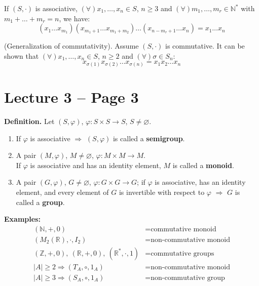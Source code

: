 \begin{corollary}
If $(S, \cdot)$ is associative, $(\forall) x_1, \dots, x_n \in S$, $n \ge 3$ and $(\forall) m_1, \dots, m_r \in \mathbb{N}^*$ with $m_1 + \dots + m_r = n$, we have:
$$ (x_1 \dots x_{m_1})(x_{m_1+1} \dots x_{m_1+m_2}) \dots (x_{n-m_r+1} \dots x_n) = x_1 \dots x_n $$
\end{corollary}

\begin{example}
(Generalization of commutativity). Assume $(S, \cdot)$ is commutative. It can be shown that $(\forall) x_1, \dots, x_n \in S$, $n \ge 2$ and $(\forall) \sigma \in S_n$:
$$ x_{\sigma(1)} x_{\sigma(2)} \dots x_{\sigma(n)} = x_1 x_2 \dots x_n $$
\end{example}





\section*{Lecture 3 -- Page 3}

\noindent\textbf{Definition.} Let $(S,\varphi)$, $\varphi : S \times S \to S$, $S \neq \varnothing$.

\begin{enumerate}
\item[(1)] If $\varphi$ is associative $\Rightarrow$ $(S,\varphi)$ is called a \textbf{semigroup}.

\item[(2)] A pair $(M,\varphi)$, $M \neq \varnothing$, $\varphi : M \times M \to M$.\\
If $\varphi$ is associative and has an identity element, $M$ is called a \textbf{monoid}.

\item[(3)] A pair $(G,\varphi)$, $G \neq \varnothing$, $\varphi : G \times G \to G$; if $\varphi$ is associative, has an identity element, and every element of $G$ is invertible with respect to $\varphi$ $\Rightarrow$ $G$ is called a \textbf{group}.
\end{enumerate}

\noindent\textbf{Examples:}
\begin{align*}
(\mathbb{N},+,0) &= \text{commutative monoid} \\
(M_2(\mathbb{R}), \cdot, I_2) &= \text{non-commutative monoid} \\
(\mathbb{Z},+,0),\ (\mathbb{R},+,0),\ (\mathbb{R}^*,\cdot,1) &= \text{commutative groups} \\
|A| \geq 2 \Rightarrow (T_A,\circ,1_A) &= \text{non-commutative monoid} \\
|A| \geq 3 \Rightarrow (S_A,\circ,1_A) &= \text{non-commutative group}
\end{align*}

